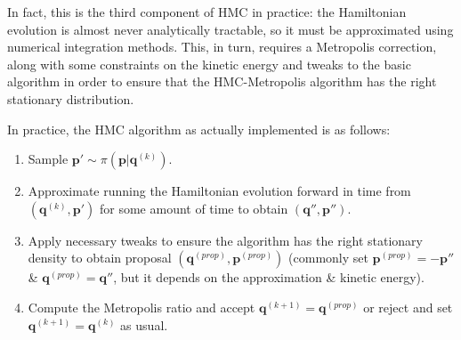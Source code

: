 \documentclass{article}
\begin{document}
In fact, this is the third component of HMC in practice: the Hamiltonian evolution is almost never analytically tractable, so it must be approximated using numerical integration methods. This, in turn, requires a Metropolis correction, along with some constraints on the kinetic energy and tweaks to the basic algorithm in order to ensure that the HMC-Metropolis algorithm has the right stationary distribution.

In practice, the HMC algorithm as actually implemented is as follows:
\begin{enumerate}
\item Sample $\bm{p}' \sim \pi(\bm{p}|\bm{q}^{(k)})$.
\item Approximate running the Hamiltonian evolution forward in time from $(\bm{q}^{(k)}, \bm{p}')$ for some amount of time to obtain $(\bm{q}'', \bm{p}'')$.
\item Apply necessary tweaks to ensure the algorithm has the right stationary density to obtain proposal $(\bm{q}^{(prop)}, \bm{p}^{(prop)})$ (commonly set $\bm{p}^{(prop)} = -\bm{p}''$ \& $\bm{q}^{(prop)} = \bm{q}''$, but it depends on the approximation \& kinetic energy).
\item Compute the Metropolis ratio and accept $\bm{q}^{(k+1)} = \bm{q}^{(prop)}$ or reject and set $\bm{q}^{(k+1)}=\bm{q}^{(k)}$ as usual.
\end{enumerate}
\end{document}
